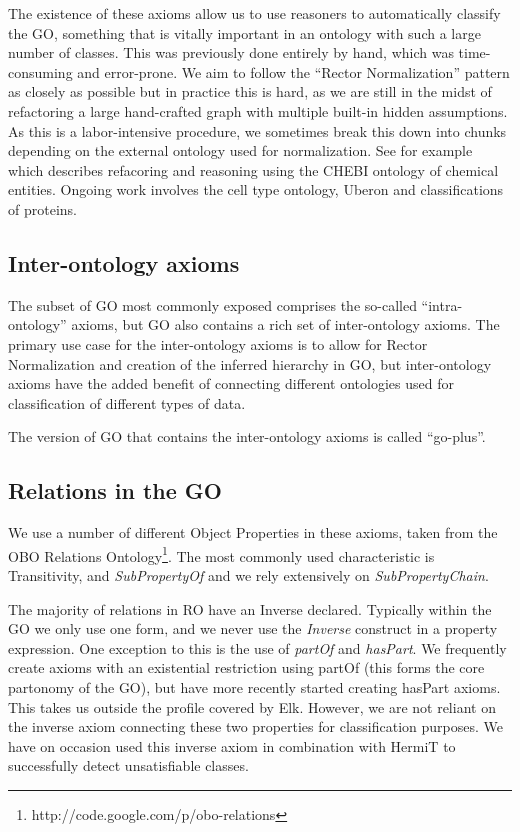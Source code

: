 \documentclass{llncs}
\begin{document}
The existence of these axioms allow us to use reasoners to
automatically classify the GO, something that is vitally important in
an ontology with such a large number of classes. This was previously
done entirely by hand, which was time-consuming and error-prone. We
aim to follow the ``Rector Normalization''
pattern\cite{rector_modularisation_2003} as closely as possible but in
practice this is hard, as we are still in the midst of refactoring a
large hand-crafted graph with multiple built-in hidden assumptions. As
this is a labor-intensive procedure, we sometimes break this down into
chunks depending on the external ontology used for normalization. See
for example \cite{Hill2013} which describes refacoring and reasoning
using the CHEBI ontology of chemical entities. Ongoing work involves
the cell type ontology, Uberon and classifications of proteins.

\subsection{Inter-ontology axioms}

The subset of GO most commonly exposed comprises the so-called
``intra-ontology'' axioms, but GO also contains a rich set of
inter-ontology axioms. The primary use case for the inter-ontology
axioms is to allow for Rector Normalization and creation of the
inferred hierarchy in GO, but inter-ontology axioms have the added
benefit of connecting different ontologies used for classification of
different types of data.

The version of GO that contains the inter-ontology axioms is called
``go-plus''.

\subsection{Relations in the GO}

We use a number of different Object Properties in these axioms, taken
from the OBO Relations
Ontology\footnote{http://code.google.com/p/obo-relations}. The most
commonly used characteristic is Transitivity, and \emph{SubPropertyOf}
and we rely extensively on \emph{SubPropertyChain}.

The majority of relations in RO have an Inverse declared. Typically
within the GO we only use one form, and we never use the
\emph{Inverse} construct in a property expression. One exception to
this is the use of \emph{partOf} and \emph{hasPart}. We frequently
create axioms with an existential restriction using partOf (this forms
the core partonomy of the GO), but have more recently started creating
hasPart axioms\cite{berardini2010gene}. This takes us outside the
profile covered by Elk. However, we are not reliant on the inverse
axiom connecting these two properties for classification purposes. We
have on occasion used this inverse axiom in combination with HermiT to
successfully detect unsatisfiable classes.
\end{document}
